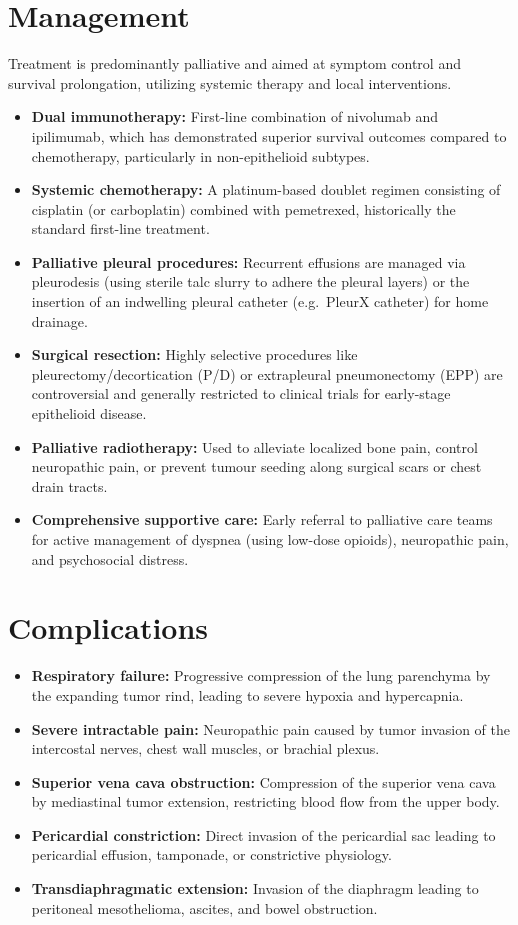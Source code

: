 \section*{Management}
Treatment is predominantly palliative and aimed at symptom control and survival prolongation, utilizing systemic therapy and local interventions.
\begin{itemize}
    \item \textbf{Dual immunotherapy:} First-line combination of nivolumab and ipilimumab, which has demonstrated superior survival outcomes compared to chemotherapy, particularly in non-epithelioid subtypes.
    \item \textbf{Systemic chemotherapy:} A platinum-based doublet regimen consisting of cisplatin (or carboplatin) combined with pemetrexed, historically the standard first-line treatment.
    \item \textbf{Palliative pleural procedures:} Recurrent effusions are managed via pleurodesis (using sterile talc slurry to adhere the pleural layers) or the insertion of an indwelling pleural catheter (e.g.\ PleurX catheter) for home drainage.
    \item \textbf{Surgical resection:} Highly selective procedures like pleurectomy/decortication (P/D) or extrapleural pneumonectomy (EPP) are controversial and generally restricted to clinical trials for early-stage epithelioid disease.
    \item \textbf{Palliative radiotherapy:} Used to alleviate localized bone pain, control neuropathic pain, or prevent tumour seeding along surgical scars or chest drain tracts.
    \item \textbf{Comprehensive supportive care:} Early referral to palliative care teams for active management of dyspnea (using low-dose opioids), neuropathic pain, and psychosocial distress.
\end{itemize}

\section*{Complications}
\begin{itemize}
    \item \textbf{Respiratory failure:} Progressive compression of the lung parenchyma by the expanding tumor rind, leading to severe hypoxia and hypercapnia.
    \item \textbf{Severe intractable pain:} Neuropathic pain caused by tumor invasion of the intercostal nerves, chest wall muscles, or brachial plexus.
    \item \textbf{Superior vena cava obstruction:} Compression of the superior vena cava by mediastinal tumor extension, restricting blood flow from the upper body.
    \item \textbf{Pericardial constriction:} Direct invasion of the pericardial sac leading to pericardial effusion, tamponade, or constrictive physiology.
    \item \textbf{Transdiaphragmatic extension:} Invasion of the diaphragm leading to peritoneal mesothelioma, ascites, and bowel obstruction.
\end{itemize}

